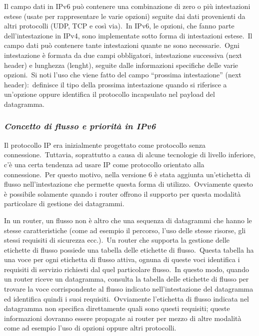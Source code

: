 Il campo dati in IPv6 può contenere una combinazione di zero o più intestazioni estese (usate per rappresentare le varie opzioni) seguite dai dati provenienti da altri protocolli (UDP, TCP e così via).\
In IPv6, le opzioni, che fanno parte dell'intestazione in IPv4, sono implementate sotto forma di intestazioni estese.\
Il campo dati può contenere tante intestazioni quante ne sono necessarie.\
Ogni intestazione è formata da due campi obbligatori, intestazione successiva (next header) e lunghezza (lenght), seguite dalle informazioni specifiche delle varie opzioni.\
Si noti l'uso che viene fatto del campo ``prossima intestazione'' (next header):\ definisce il tipo della prossima intestazione quando si riferisce a un'opzione oppure identifica il protocollo incapsulato nel payload del datagramma.

\subsubsection{\emph{Concetto di flusso e priorità in IPv6}}

Il protocollo IP era inizialmente progettato come protocollo senza connessione.\
Tuttavia, soprattutto a causa di alcune tecnologie di livello inferiore, c'è una certa tendenza ad usare IP come protocollo orientato alla connessione.\
Per questo motivo, nella versione 6 è stata aggiunta un'etichetta di flusso nell'intestazione che permette questa forma di utilizzo.\
Ovviamente questo è possibile solamente quando i router offrono il supporto per questa modalità particolare di gestione dei datagrammi.

In un router, un flusso non è altro che una sequenza di datagrammi che hanno le stesse caratteristiche (come ad esempio il percorso, l'uso delle stesse risorse, gli stessi requisiti di sicurezza ecc.).\
Un router che supporta la gestione delle etichette di flusso possiede una tabella delle etichette di flusso.\
Questa tabella ha una voce per ogni etichetta di flusso attiva, ognuna di queste voci identifica i requisiti di servizio richiesti dal quel particolare flusso.\
In questo modo, quando un router riceve un datagramma, consulta la tabella delle etichette di flusso per trovare la voce corrispondente al flusso indicato nell'intestazione del datagramma ed identifica quindi i suoi requisiti.\
Ovviamente l'etichetta di flusso indicata nel datagramma non specifica direttamente quali sono questi requisiti; queste informazioni dovranno essere propagate ai router per mezzo di altre modalità come ad esempio l'uso di opzioni oppure altri protocolli.

